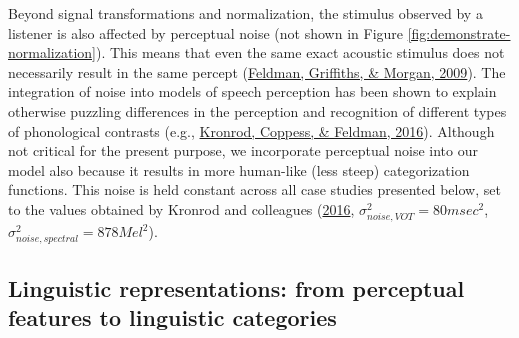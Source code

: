 \documentclass[
  11pt,
  man,floatsintext]{apa6}
\begin{document}
Beyond signal transformations and normalization, the stimulus observed by a listener is also affected by perceptual noise (not shown in Figure \ref{fig:demonstrate-normalization}). This means that even the same exact acoustic stimulus does not necessarily result in the same percept (\protect\hyperlink{ref-feldman2009}{Feldman, Griffiths, \& Morgan, 2009}). The integration of noise into models of speech perception has been shown to explain otherwise puzzling differences in the perception and recognition of different types of phonological contrasts (e.g., \protect\hyperlink{ref-kronrod2016}{Kronrod, Coppess, \& Feldman, 2016}). Although not critical for the present purpose, we incorporate perceptual noise into our model also because it results in more human-like (less steep) categorization functions. This noise is held constant across all case studies presented below, set to the values obtained by Kronrod and colleagues (\protect\hyperlink{ref-kronrod2016}{2016}, \(\sigma^2_{noise, VOT}=80 msec^2\), \(\sigma^2_{noise, spectral}=878 Mel^2\)).

\hypertarget{sec:representations}{%
\subsection{Linguistic representations: from perceptual features to linguistic categories}\label{sec:representations}}
\end{document}
